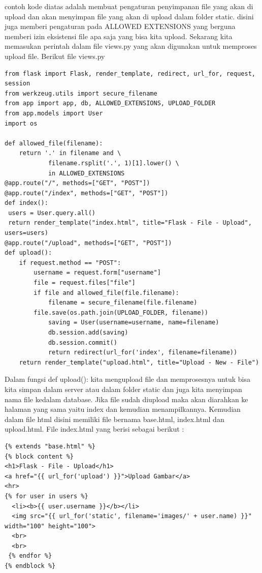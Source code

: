 contoh kode diatas adalah membuat pengaturan penyimpanan file yang akan di upload dan akan menyimpan file yang akan di upload dalam folder static. disini juga memberi pengaturan pada ALLOWED EXTENSIONS yang berguna memberi izin eksistensi file apa saja yang bisa kita upload.
Sekarang kita memasukan perintah dalam file views.py yang akan digunakan untuk memproses upload file. Berikut file views.py
\begin{verbatim}
from flask import Flask, render_template, redirect, url_for, request, session
from werkzeug.utils import secure_filename
from app import app, db, ALLOWED_EXTENSIONS, UPLOAD_FOLDER
from app.models import User
import os

def allowed_file(filename):
    return '.' in filename and \
            filename.rsplit('.', 1)[1].lower() \
            in ALLOWED_EXTENSIONS
@app.route("/", methods=["GET", "POST"])
@app.route("/index", methods=["GET", "POST"])
def index():
 users = User.query.all()
 return render_template("index.html", title="Flask - File - Upload", users=users)
@app.route("/upload", methods=["GET", "POST"])
def upload():
    if request.method == "POST":
        username = request.form["username"]
        file = request.files["file"]
        if file and allowed_file(file.filename):
            filename = secure_filename(file.filename)
        file.save(os.path.join(UPLOAD_FOLDER, filename))
            saving = User(username=username, name=filename)
            db.session.add(saving)
            db.session.commit()
            return redirect(url_for('index', filename=filename))
    return render_template("upload.html", title="Upload - New - File")
\end{verbatim}
Dalam fungsi def upload(): kita mengupload file dan memprosesnya untuk bisa kita simpan dalam server atau dalam folder static dan juga kita menyimpan nama file kedalam database. Jika file sudah diupload maka akan diarahkan ke halaman yang sama yaitu index dan kemudian menampilkannya.
Kemudian dalam file html disini memiliki file bernama base.html, index.html dan upload.html. File index.html yang berisi sebagai berikut :
\begin{verbatim}
{% extends "base.html" %}
{% block content %}
<h1>Flask - File - Upload</h1>
<a href="{{ url_for('upload') }}">Upload Gambar</a>
<hr>
{% for user in users %}
  <li><b>{{ user.username }}</b></li>
  <img src="{{ url_for('static', filename='images/' + user.name) }}" width="100" height="100">
  <br>
  <br>
 {% endfor %}
{% endblock %}
\end{verbatim}


